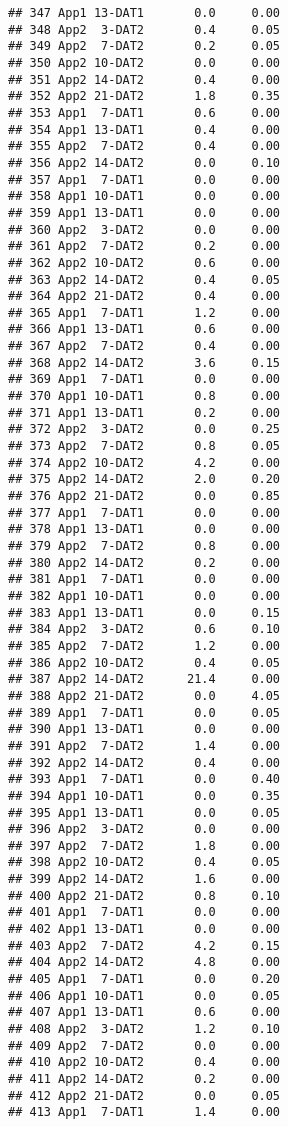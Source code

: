 \documentclass[
]{article}
\begin{document}
\begin{verbatim}
## 347 App1 13-DAT1       0.0     0.00
## 348 App2  3-DAT2       0.4     0.05
## 349 App2  7-DAT2       0.2     0.05
## 350 App2 10-DAT2       0.0     0.00
## 351 App2 14-DAT2       0.4     0.00
## 352 App2 21-DAT2       1.8     0.35
## 353 App1  7-DAT1       0.6     0.00
## 354 App1 13-DAT1       0.4     0.00
## 355 App2  7-DAT2       0.4     0.00
## 356 App2 14-DAT2       0.0     0.10
## 357 App1  7-DAT1       0.0     0.00
## 358 App1 10-DAT1       0.0     0.00
## 359 App1 13-DAT1       0.0     0.00
## 360 App2  3-DAT2       0.0     0.00
## 361 App2  7-DAT2       0.2     0.00
## 362 App2 10-DAT2       0.6     0.00
## 363 App2 14-DAT2       0.4     0.05
## 364 App2 21-DAT2       0.4     0.00
## 365 App1  7-DAT1       1.2     0.00
## 366 App1 13-DAT1       0.6     0.00
## 367 App2  7-DAT2       0.4     0.00
## 368 App2 14-DAT2       3.6     0.15
## 369 App1  7-DAT1       0.0     0.00
## 370 App1 10-DAT1       0.8     0.00
## 371 App1 13-DAT1       0.2     0.00
## 372 App2  3-DAT2       0.0     0.25
## 373 App2  7-DAT2       0.8     0.05
## 374 App2 10-DAT2       4.2     0.00
## 375 App2 14-DAT2       2.0     0.20
## 376 App2 21-DAT2       0.0     0.85
## 377 App1  7-DAT1       0.0     0.00
## 378 App1 13-DAT1       0.0     0.00
## 379 App2  7-DAT2       0.8     0.00
## 380 App2 14-DAT2       0.2     0.00
## 381 App1  7-DAT1       0.0     0.00
## 382 App1 10-DAT1       0.0     0.00
## 383 App1 13-DAT1       0.0     0.15
## 384 App2  3-DAT2       0.6     0.10
## 385 App2  7-DAT2       1.2     0.00
## 386 App2 10-DAT2       0.4     0.05
## 387 App2 14-DAT2      21.4     0.00
## 388 App2 21-DAT2       0.0     4.05
## 389 App1  7-DAT1       0.0     0.05
## 390 App1 13-DAT1       0.0     0.00
## 391 App2  7-DAT2       1.4     0.00
## 392 App2 14-DAT2       0.4     0.00
## 393 App1  7-DAT1       0.0     0.40
## 394 App1 10-DAT1       0.0     0.35
## 395 App1 13-DAT1       0.0     0.05
## 396 App2  3-DAT2       0.0     0.00
## 397 App2  7-DAT2       1.8     0.00
## 398 App2 10-DAT2       0.4     0.05
## 399 App2 14-DAT2       1.6     0.00
## 400 App2 21-DAT2       0.8     0.10
## 401 App1  7-DAT1       0.0     0.00
## 402 App1 13-DAT1       0.0     0.00
## 403 App2  7-DAT2       4.2     0.15
## 404 App2 14-DAT2       4.8     0.00
## 405 App1  7-DAT1       0.0     0.20
## 406 App1 10-DAT1       0.0     0.05
## 407 App1 13-DAT1       0.6     0.00
## 408 App2  3-DAT2       1.2     0.10
## 409 App2  7-DAT2       0.0     0.00
## 410 App2 10-DAT2       0.4     0.00
## 411 App2 14-DAT2       0.2     0.00
## 412 App2 21-DAT2       0.0     0.05
## 413 App1  7-DAT1       1.4     0.00

\end{verbatim}
\end{document}
